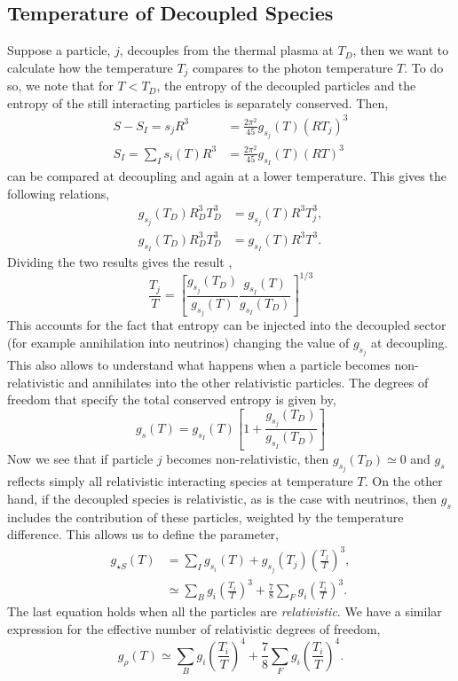 \documentclass[11pt]{article}
\numberwithin{equation}{section}
\numberwithin{figure}{section}
\numberwithin{table}{section}
\begin{document}
\subsection{Temperature of Decoupled Species}
Suppose a particle, $j$, decouples from the thermal plasma at $T_D$, then we want to calculate how the temperature $T_j$ compares to the photon temperature $T$. To do so, we note that for $T < T_D$, the entropy of the decoupled particles and the entropy of the still interacting particles is separately conserved. Then,
\begin{align*}
S - S_I = s_j R^3 &= \frac{2\pi^2}{45}g_{s_j}(T) (RT_j)^3 \\
S_I = \sum_{I}{s_i(T)R^3} &= \frac{2\pi^2}{45}g_{s_I}(T)(RT)^3
\end{align*}
can be compared at decoupling and again at a lower temperature. This gives the following relations,
\begin{align*}
g_{s_j}(T_D) R_D^3 T_D^3 &= g_{s_j}(T) R^3 T_j^3, \\
g_{s_I}(T_D) R_D^3 T_D^3 &= g_{s_I}(T) R^3 T^3.
\end{align*}
Dividing the two results gives the result \citep{Srednicki:1988ce},
\begin{equation}\label{eq:tnutg}
\frac{T_j}{T} = \left[\frac{g_{s_j}(T_D)}{g_{s_j}(T)}\frac{g_{s_I}(T)}{g_{s_I}(T_D)}\right]^{1/3}
\end{equation}
This accounts for the fact that entropy can be injected into the decoupled sector (for example annihilation into neutrinos) changing the value of $g_{s_j}$ at decoupling. This also allows to understand what happens when a particle becomes non-relativistic and annihilates into the other relativistic particles. The degrees of freedom that specify the total conserved entropy is given by,
\begin{equation}
g_s(T) = g_{s_I}(T)\left[1 + \frac{g_{s_j}(T_D)}{g_{s_I}(T_D)}\right]
\end{equation}
Now we see that if particle $j$ becomes non-relativistic, then $g_{s_j}(T_D) \simeq 0$ and $g_s$ reflects simply all relativistic interacting species at temperature $T$. On the other hand, if the decoupled species is relativistic, as is the case with neutrinos, then $g_s$ includes the contribution of these particles, weighted by the temperature difference. This allows us to define the parameter,
\begin{align}
g_{\star S}(T) &= \sum_{I}{g_{s_i}(T)} + g_{s_j}(T_j)\left(\frac{T_j}{T}\right)^3, \\
&\simeq \sum_{B}{g_i\left(\frac{T_i}{T}\right)^3} + \frac{7}{8}\sum_{F}{g_i\left(\frac{T_i}{T}\right)^3}.
\end{align}
The last equation holds when all the particles are \textit{relativistic}. We have a similar expression for the effective number of relativistic degrees of freedom,
\begin{equation}
g_\rho(T) \simeq \sum_{B}{g_i\left(\frac{T_i}{T}\right)^4} + \frac{7}{8}\sum_{F}{g_i\left(\frac{T_i}{T}\right)^4}. \label{eq:grho}
\end{equation}
\end{document}
